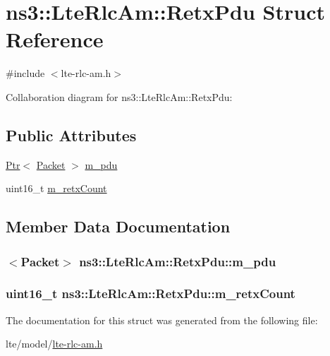 \hypertarget{structns3_1_1LteRlcAm_1_1RetxPdu}{}\section{ns3\+:\+:Lte\+Rlc\+Am\+:\+:Retx\+Pdu Struct Reference}
\label{structns3_1_1LteRlcAm_1_1RetxPdu}


{\ttfamily \#include $<$lte-\/rlc-\/am.\+h$>$}



Collaboration diagram for ns3\+:\+:Lte\+Rlc\+Am\+:\+:Retx\+Pdu\+:
\subsection*{Public Attributes}
\begin{DoxyCompactItemize}
\item 
\hyperlink{classns3_1_1Ptr}{Ptr}$<$ \hyperlink{classns3_1_1Packet}{Packet} $>$ \hyperlink{structns3_1_1LteRlcAm_1_1RetxPdu_a973f4fa0a9df8d1d7c2ddc99cdb4c106}{m\+\_\+pdu}
\item 
uint16\+\_\+t \hyperlink{structns3_1_1LteRlcAm_1_1RetxPdu_a22f70598baa92d67f1f82a757fd7bf16}{m\+\_\+retx\+Count}
\end{DoxyCompactItemize}


\subsection{Member Data Documentation}
\subsubsection[{\texorpdfstring{m\+\_\+pdu}{m_pdu}}]{$<${\bf Packet}$>$ ns3\+::\+Lte\+Rlc\+Am\+::\+Retx\+Pdu\+::m\+\_\+pdu}\hypertarget{structns3_1_1LteRlcAm_1_1RetxPdu_a973f4fa0a9df8d1d7c2ddc99cdb4c106}{}\label{structns3_1_1LteRlcAm_1_1RetxPdu_a973f4fa0a9df8d1d7c2ddc99cdb4c106}
\subsubsection[{\texorpdfstring{m\+\_\+retx\+Count}{m_retxCount}}]{\setlength{\rightskip}{0pt plus 5cm}uint16\+\_\+t ns3\+::\+Lte\+Rlc\+Am\+::\+Retx\+Pdu\+::m\+\_\+retx\+Count}\hypertarget{structns3_1_1LteRlcAm_1_1RetxPdu_a22f70598baa92d67f1f82a757fd7bf16}{}\label{structns3_1_1LteRlcAm_1_1RetxPdu_a22f70598baa92d67f1f82a757fd7bf16}


The documentation for this struct was generated from the following file\+:\begin{DoxyCompactItemize}
\item 
lte/model/\hyperlink{lte-rlc-am_8h}{lte-\/rlc-\/am.\+h}\end{DoxyCompactItemize}
